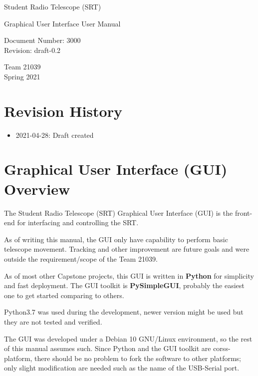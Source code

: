 \documentclass{article}
\begin{document}
\begin{titlepage}
  \begin{center}

    \vspace*{5cm}
    \huge Student Radio Telescope (SRT)

    \vspace*{2cm}
    \Large Graphical User Interface User Manual

    \vspace*{2cm}
    \large Document Number: 3000\\
    Revision: draft-0.2

    \vspace*{2.0cm}
    \large
    Team 21039\\
    Spring 2021

  \end{center}
\end{titlepage}

\tableofcontents
\pagebreak

\section{Revision History}
\begin{itemize}
  \item 2021-04-28: Draft created
\end{itemize}


\section{Graphical User Interface (GUI) Overview}
The Student Radio Telescope (SRT) Graphical User Interface (GUI) is the front-end for interfacing and controlling the SRT.

As of writing this manual, the GUI only have capability to perform basic telescope movement. Tracking and other improvement are future goals and were outside the requirement/scope of the Team 21039.

As of most other Capstone projects, this GUI is written in \textbf{Python} for simplicity and fast deployment. The GUI toolkit is \textbf{PySimpleGUI}, probably the easiest one to get started comparing to others.

Python3.7 was used during the development, newer version might be used but they are not tested and verified.

The GUI was developed under a Debian 10 GNU/Linux environment, so the rest of this manual assumes such. Since Python and the GUI toolkit are corss-platform, there should be no problem to fork the software to other platforms; only slight modification are needed such as the name of the USB-Serial port.
\end{document}
